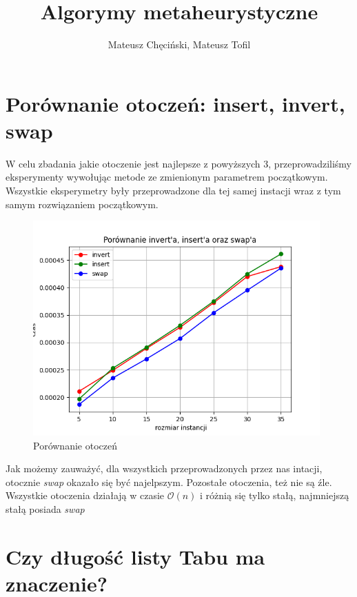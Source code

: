 \documentclass{article}
\begin{document}
    \begin{titlepage}
        \title{Algorymy metaheurystyczne}
        \author{Mateusz Chęciński, Mateusz Tofil}
        \maketitle
    \end{titlepage}

    \section{Porównanie otoczeń: insert, invert, swap}

    W celu zbadania jakie otoczenie jest najlepsze z
    powyższych 3, przeprowadziliśmy eksperymenty wywołując
    metode ze zmienionym parametrem początkowym. Wszystkie
    eksperymetry były przeprowadzone dla tej samej instacji
    wraz z tym samym rozwiązaniem początkowym.

    \begin{figure}[h!]
        \centering
        \includegraphics[width=11cm]{./spr2img/Figure_1.png}
        \caption{Porównanie otoczeń}
    \end{figure}

    Jak możemy zauważyć, dla wszystkich przeprowadzonych
    przez nas intacji, otocznie \emph{swap} okazało się być
    najelpszym. Pozostałe otoczenia, też nie są źle. Wszystkie
    otoczenia działają w czasie $\mathcal{O}(n)$ i różnią się tylko
    stałą, najmniejszą stałą posiada \emph{swap}

    \section{Czy długość listy Tabu ma znaczenie? }
\end{document}
